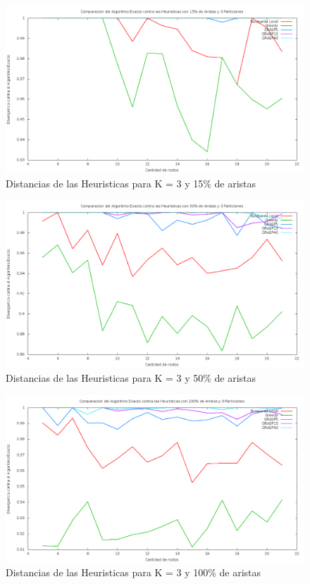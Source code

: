 \begin{figure}[H]
\begin{center}
\includegraphics[scale=0.3]{finales/ComparacionesCon3Particiones15Aristas.png}
\caption{Distancias de las Heuristicas para K = 3 y 15\% de aristas}
\end{center}
\end{figure}

\begin{figure}[H]
\begin{center}
\includegraphics[scale=0.3]{finales/ComparacionesCon3Particiones50Aristas.png}
\caption{Distancias de las Heuristicas para K = 3 y 50\% de aristas}
\end{center}
\end{figure}

\begin{figure}[H]
\begin{center}
\includegraphics[scale=0.3]{finales/ComparacionesCon3Particiones100Aristas.png}
\caption{Distancias de las Heuristicas para K = 3 y 100\% de aristas}
\end{center}
\end{figure}


